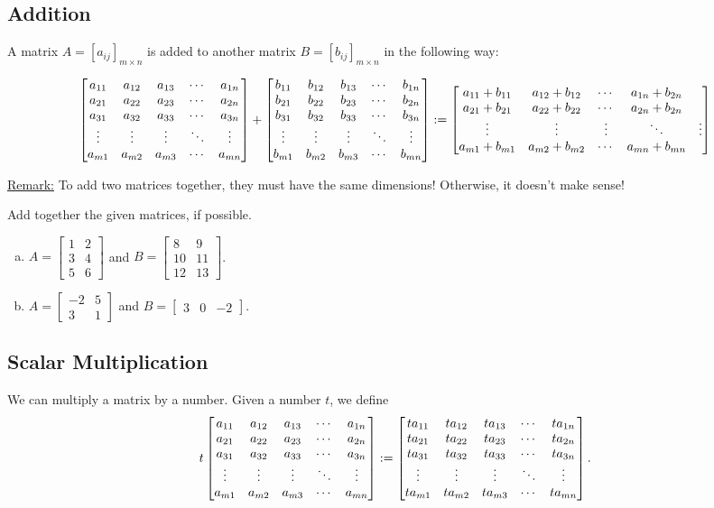 \documentclass[12pt,a4paper]{article}
\newcounter{example}[section]
\begin{document}
	\vspace*{2cm}

\subsection{Addition}
A matrix $A = [a_{ij}]_{m \times n}$ is added to another matrix $B = [b_{ij}]_{m \times n}$ in the following way:

\begin{footnotesize}
	\begin{align*}
	\matMN{a} + \matMN{b} := \matMN{a}{b}
	\end{align*}
\end{footnotesize}

\vspace*{8pt}

\noindent\underline{Remark:} To add two matrices together, they must have the same dimensions! Otherwise, it doesn't make sense!

\vspace*{16pt}
	
	\begin{example}
	Add together the given matrices, if possible.
	\begin{multicols}{2}
		\begin{enumerate}[a)]
		\item $A = \begin{bmatrix}
		1 & 2 \\ 3 & 4 \\ 5 & 6
		\end{bmatrix}$ and
		$B = \begin{bmatrix}
		8 & 9 \\
		10 & 11 \\
		12 & 13
		\end{bmatrix}$.
		\item $A = \begin{bmatrix}
		-2 & 5 \\ 3 & 1
		\end{bmatrix}$ and
		$B = \begin{bmatrix}
		3 & 0 & -2
		\end{bmatrix}$.
		\end{enumerate}
	\end{multicols}
	\end{example}

\newpage

\subsection{Scalar Multiplication}
We can multiply a matrix by a number. Given a number $t$, we define 
	\begin{align*}
	t \matMN{a} := \matMN{t a} .
	\end{align*}
\end{document}
